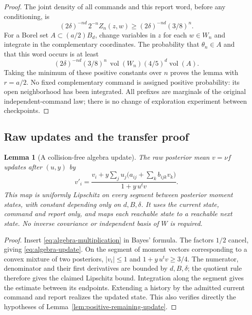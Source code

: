 \documentclass[11pt]{amsart}
\newtheorem{lemma}[theorem]{Lemma}
\theoremstyle{definition}\newtheorem{definition}[theorem]{Definition}
\theoremstyle{remark}\newtheorem{remark}[theorem]{Remark}
\begin{document}
\begin{proof}
The joint density of all commands and this report word, before any
conditioning, is
\[
 (2\delta)^{-nd}\,2^{-n}Z_n(z,w)
                         \ge (2\delta)^{-nd}(3/8)^n.
\]
For a Borel set $A\subset(a/2)B_d$, change variables in $z$ for each
$w\in W_n$ and integrate in the complementary coordinates. The
probability that $\theta_n\in A$ and that this word occurs is at least
\[
 (2\delta)^{-nd}(3/8)^n\,\operatorname{vol}(W_n)
                                      (4/5)^d\operatorname{vol}(A).
\]
Taking the minimum of these positive constants over $n$ proves the
lemma with $r=a/2$. No fixed complementary command is assigned
positive probability: its open neighborhood has been integrated.
All prefixes are marginals of the original independent-command law;
there is no change of exploration experiment between checkpoints.
\end{proof}

\subsection{Raw updates and the transfer proof}
\begin{lemma}[A collision-free algebra update]
\label{lem:algebra-update}
The raw posterior mean $v=\nu f$ updates after $(u,y)$ by
\begin{equation}\label{eq:algebra-update}
 v'_i=\frac{v_i+y\sum_j u_j\bigl(a_{ij}+\sum_k b_{ijk}v_k\bigr)}
                        {1+y\,u^tv}.
\end{equation}
This map is uniformly Lipschitz on every segment between posterior
moment states, with constant depending only on $d,B,\delta$.
It uses the current state, command and report only, and maps each
reachable state to a reachable next state. No inverse covariance or
independent basis of $W$ is required.
\end{lemma}
\begin{proof}
Insert \eqref{eq:algebra-multiplication} in Bayes' formula. The factors
$1/2$ cancel, giving \eqref{eq:algebra-update}. On the segment of
moment vectors corresponding to a convex mixture of two posteriors,
$|v_i|\le1$ and $1+y\,u^tv\ge3/4$. The numerator, denominator and
their first derivatives are bounded by $d,B,\delta$; the quotient rule
therefore gives the claimed Lipschitz bound. Integration along the
segment gives the estimate between its endpoints. Extending a history
by the admitted current command and report realizes the updated state.
This also verifies directly the hypotheses of
Lemma~\ref{lem:positive-remaining-update}.
\end{proof}
\end{document}
